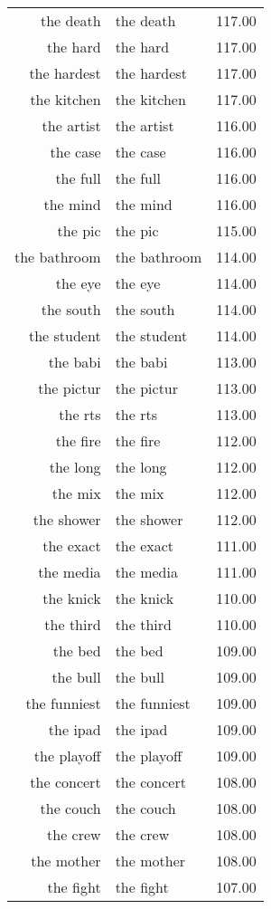\begin{table}[ht]
\begin{tabular}{rlr}
  the death & the death & 117.00 \\ 
  the hard & the hard & 117.00 \\ 
  the hardest & the hardest & 117.00 \\ 
  the kitchen & the kitchen & 117.00 \\ 
  the artist & the artist & 116.00 \\ 
  the case & the case & 116.00 \\ 
  the full & the full & 116.00 \\ 
  the mind & the mind & 116.00 \\ 
  the pic & the pic & 115.00 \\ 
  the bathroom & the bathroom & 114.00 \\ 
  the eye & the eye & 114.00 \\ 
  the south & the south & 114.00 \\ 
  the student & the student & 114.00 \\ 
  the babi & the babi & 113.00 \\ 
  the pictur & the pictur & 113.00 \\ 
  the rts & the rts & 113.00 \\ 
  the fire & the fire & 112.00 \\ 
  the long & the long & 112.00 \\ 
  the mix & the mix & 112.00 \\ 
  the shower & the shower & 112.00 \\ 
  the exact & the exact & 111.00 \\ 
  the media & the media & 111.00 \\ 
  the knick & the knick & 110.00 \\ 
  the third & the third & 110.00 \\ 
  the bed & the bed & 109.00 \\ 
  the bull & the bull & 109.00 \\ 
  the funniest & the funniest & 109.00 \\ 
  the ipad & the ipad & 109.00 \\ 
  the playoff & the playoff & 109.00 \\ 
  the concert & the concert & 108.00 \\ 
  the couch & the couch & 108.00 \\ 
  the crew & the crew & 108.00 \\ 
  the mother & the mother & 108.00 \\ 
  the fight & the fight & 107.00 \\ 

\end{tabular}
\end{table}
